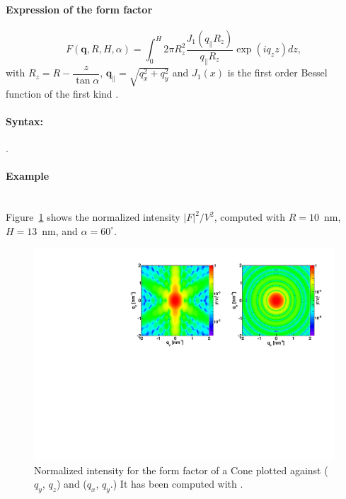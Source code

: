 \paragraph{Expression of the form factor}
\begin{equation*}
F(\mathbf{q}, R, H, \alpha) = \int_0 ^H 2\pi R_z^2
\frac{J_1(q_{\parallel}R_z)}{q_{\parallel} R_z}\exp(iq_z z)dz,
\end{equation*}
with $R_z =R-\dfrac{z}{\tan \alpha}$, $\mathbf{q}_{\parallel}=\sqrt{q_x^2+ q_y^2}$ and $J_1(x)$ is the first order
Bessel function of the first kind \cite{AbSt64}.

\paragraph{Syntax:}  . 

\paragraph{Example}\mbox{}\\
Figure~\ref{fig:FFConeEx} shows the normalized intensity
$|F|^2/V^2$, computed with $R=10$~nm, $H=13$~nm, and $\alpha=60^{\circ}$.
\begin{figure}[ht]
\begin{center}
\includegraphics[angle=-90,width=\textwidth]{Figures/ff/figffcone.pdf}
\end{center}
\caption{Normalized intensity for the form factor of a Cone plotted against ($q_y$, $q_z$) and ($q_x$, $q_y$.) It
  has been  computed with .}
\label{fig:FFConeEx}
\end{figure}

